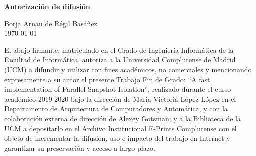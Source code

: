 \newpage
\thispagestyle{empty}
\begin{center}
   {\bf \Huge Autorización de difusión}
   \vspace{1cm}

   \large Borja Arnau de Régil Basáñez\\
   \vspace{0.5cm}
   \today\\
   \vspace{0.5cm}
\end{center}

El abajo firmante, matriculado en el Grado de Ingeniería Informática de la Facultad de Informática, autoriza a la Universidad Complutense de Madrid (UCM) a difundir y utilizar con fines académicos, no comerciales y mencionando expresamente a su autor el presente Trabajo Fin de Grado: ``A fast implementation of Parallel Snapshot Isolation'', realizado durante el curso académico 2019-2020 bajo la dirección de Maria Victoria López López en el Departamento de Arquitectura de Computadores y Automática, y con la colaboración externa de dirección de Alexey Gotsman; y a la Biblioteca de la UCM a depositarlo en el Archivo Institucional E-Prints Complutense con el objeto de incrementar la difusión, uso e impacto del trabajo en Internet y garantizar su preservación y acceso a largo plazo.

